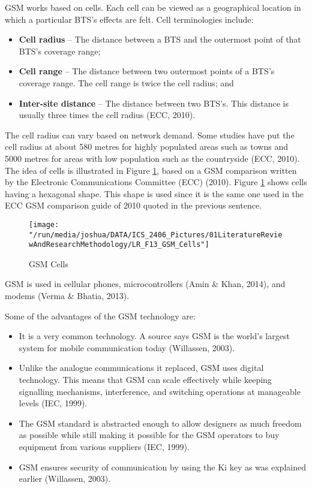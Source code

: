 \documentclass[12pt,svgnames,smaller]{article} %
\begin{document}
	GSM works based on cells. Each cell can be viewed as a geographical location in which a particular BTS’s effects are felt.  Cell terminologies include:
	
	\begin{itemize}
		\item \textbf{Cell radius} – The distance between a BTS and the outermost point of that BTS’s coverage range; 
		\item \textbf{Cell range} – The distance between two outermost points of a BTS’s coverage range. The cell range is twice the cell radius; and
		\item \textbf{Inter-site distance} – The distance between two BTS’s. This distance is usually three times the cell radius (ECC, 2010).
	\end{itemize}
	
	The cell radius can vary based on network demand. Some studies have put the cell radius at about 580 metres for highly populated areas such as towns and 5000 metres for areas with low population such as the countryside (ECC, 2010). The idea of cells is illustrated in Figure \ref{fig:LiteratureReview-Figure13}, based on a GSM comparison written by the Electronic Communications Committee (ECC) (2010). Figure \ref{fig:LiteratureReview-Figure13} shows cells having a hexagonal shape. This shape is used since it is the same one used in the ECC GSM comparison guide of 2010 quoted in the previous sentence.

	
	\begin{figure}
		\centering
		\texttt{[image: "/run/media/joshua/DATA/ICS\_2406\_Pictures/01LiteratureReviewAndResearchMethodology/LR\_F13\_GSM\_Cells"]}
		\caption{GSM Cells}
		\label{fig:LiteratureReview-Figure13}
	\end{figure}
	
	GSM is used in cellular phones, microcontrollers (Amin \& Khan, 2014), and modems (Verma \& Bhatia, 2013).

	Some of the advantages of the GSM technology are:
	
	\begin{itemize}
		\item It is a very common technology. A source says GSM is the world’s largest system for mobile communication today (Willassen, 2003).
		\item Unlike the analogue communications it replaced, GSM uses digital technology. This means that GSM can scale effectively while keeping signalling mechanisms, interference, and switching operations at manageable levels (IEC, 1999).
		\item The GSM standard is abstracted enough to allow designers as much freedom as possible while still making it possible for the GSM operators to buy equipment from various suppliers (IEC, 1999).
		\item GSM ensures security of communication by using the Ki key as was explained earlier (Willassen, 2003).
	\end{itemize}
\end{document}
